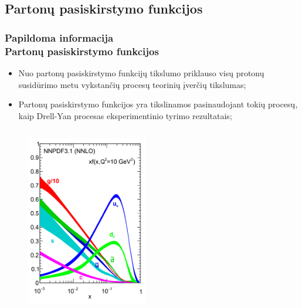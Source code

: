 \documentclass[xcolor=dvipsnames]{beamer}
\begin{document}
\begin{frame}
\subsection{Partonų pasiskirstymo funkcijos}
\frametitle{Papildoma informacija\\ \small Partonų pasiskirstymo funkcijos}
\begin{itemize}
\item Nuo partonų pasiskirstymo funkcijų tikslumo priklauso visų protonų susidūrimo metu vykstančių procesų teorinių įverčių tikslumas;
\item Partonų pasiskirstymo funkcijos yra tikslinamos pasinaudojant tokių procesų, kaip Drell-Yan procesas eksperimentinio tyrimo rezultatais;
\end{itemize}
\vspace{-0.6cm}
\begin{columns}
\begin{figure}[H]
\includegraphics[width=0.62\textwidth]{NNPDF10.PNG}
\end{figure}
\begin{figure}[H]

\end{figure}
\end{columns}
\end{frame}
\end{document}
